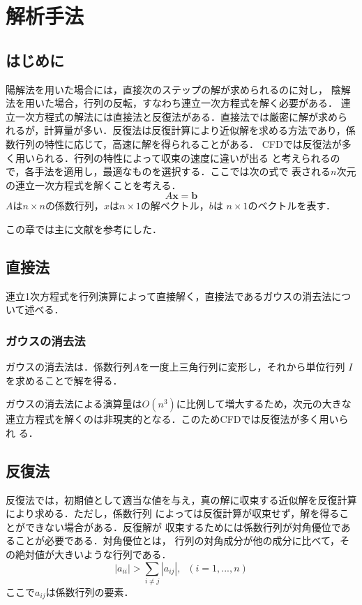 \chapter{解析手法}
\label{chap:simulation}

\section{はじめに}
陽解法を用いた場合には，直接次のステップの解が求められるのに対し，
陰解法を用いた場合，行列の反転，すなわち連立一次方程式を解く必要がある．
連立一次方程式の解法には直接法と反復法がある．直接法では厳密に解が求めら
れるが，計算量が多い．反復法は反復計算により近似解を求める方法であり，係
数行列の特性に応じて，高速に解を得られることがある．
CFDでは反復法が多く用いられる．行列の特性によって収束の速度に違いが出る
と考えられるので，各手法を適用し，最適なものを選択する．ここでは次の式で
表される$n$次元の連立一次方程式を解くことを考える．
\begin{equation}
 A\bm{x}=\bm{b}
\label{eq:linear}
\end{equation}
$A$は$n\times n$の係数行列，$x$は$n\times1$の解ベクトル，$b$は
$n\times1$のベクトルを表す．

この章では主に文献\cite{test1}を参考にした．
\section{直接法}
連立1次方程式を行列演算によって直接解く，直接法であるガウスの消去法につ
いて述べる．
\subsection{ガウスの消去法}
ガウスの消去法は．係数行列$A$を一度上三角行列に変形し，それから単位行列
$I$を求めることで解を得る．

ガウスの消去法による演算量は$O(n^3)$に比例して増大するため，次元の大きな
連立方程式を解くのは非現実的となる．このためCFDでは反復法が多く用いられ
る．

\section{反復法}
反復法では，初期値として適当な値を与え，真の解に収束する近似解を反復計算により求める．ただし，係数行列
によっては反復計算が収束せず，解を得ることができない場合がある．反復解が
収束するためには係数行列が対角優位であることが必要である．対角優位とは，
行列の対角成分が他の成分に比べて，その絶対値が大きいような行列である．
\begin{equation}
 |a_{ii}|>\sum_{i\neq j}|a_{ij}|, \;\;(i=1,...,n)
\end{equation}
ここで$a_{ij}$は係数行列の要素．
